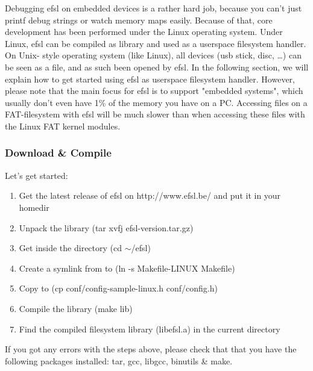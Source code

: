 Debugging efsl on embedded devices is a rather hard job, because
you can't just printf debug strings or watch memory maps easily. 
Because of that, core development has been performed under the 
Linux operating system. Under Linux, efsl can be compiled as 
library and used as a userspace filesystem handler. On Unix-
style operating system (like Linux), all devices (usb stick, disc, \ldots)
can be seen as a file, and as such been opened by efsl.\newline
\newline
In the following section, we will explain how to get started using
efsl as userspace filesystem handler. However, please note that the main
focus for efsl is to support "embedded systems", which usually don't even
have 1\% of the memory you have on a PC. Accessing files on a FAT-filesystem
with efsl will be much slower than when accessing these files with the Linux
FAT kernel modules.
\subsubsection{Download \& Compile}
Let's get started:
\begin{enumerate}
	\item{Get the latest release of efsl on http://www.efsl.be/ 
		and put it in your homedir}
	\item{Unpack the library (tar xvfj efsl-version.tar.gz)}
	\item{Get inside the directory (cd $\sim$/efsl)}
	\item{Create a symlink from  to  
		(ln -s Makefile-LINUX Makefile)}
	\item{Copy  to 
		(cp conf/config-sample-linux.h conf/config.h)}
	\item{Compile the library (make lib)}
	\item{Find the compiled filesystem library (libefsl.a) in the current 
		directory}
\end{enumerate}
If you got any errors with the steps above, please check that that you have
the following packages installed: tar, gcc, libgcc, binutils \& make.
